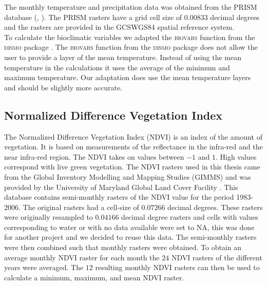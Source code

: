 The monthly temperature and precipitation data was obtained from the PRISM database (\cite{daly_knowledge-based_2002}, \citeauthor{PRISM}). The PRISM rasters have a grid cell size of $0.00833$ decimal degrees and the rasters are provided in the GCS\textunderscore WGS84 spatial reference system. \\ 

To calculate the bioclimatic variables we adapted the \textsc{biovars} function from the \textsc{dismo} package \parencite{dismo}. The \textsc{biovars} function from the \textsc{dismo} package does not allow the user to provide a layer of the mean temperature. Instead of using the mean temperature in the calculations it uses the average of the minimum and maximum temperature. Our adaptation does use the mean temperature layers and should be slightly more accurate.

\subsection{Normalized Difference Vegetation Index}
The Normalized Difference Vegetation Index (NDVI) is an index of the amount of vegetation. It is based on measurements of the reflectance in the infra-red and the near infra-red region. The NDVI takes on values between $-1$ and $1$. High values correspond with live green vegetation. The NDVI rasters used in this thesis came from the Global Inventory Modelling and Mapping Studies (GIMMS) and was provided by the University of Maryland Global Land Cover Facility \parencite{pinzon2005satellite, tucker2005extended}. This database contains semi-monthly rasters of the NDVI value for the period 1983-2006. The original rasters had a cell-size of $0.07266$ decimal degrees. These rasters were originally resampled to $0.04166$ decimal degree rasters and cells with values corresponding to water or with no data available were set to \textsc{NA}, this was done for another project and we decided to reuse this data. The semi-monthly rasters were then combined such that monthly rasters were obtained. To obtain an average monthly NDVI raster for each month the $24$ NDVI rasters of the different years were averaged. The $12$ resulting monthly NDVI rasters can then be used to calculate a minimum, maximum, and mean NDVI raster.

